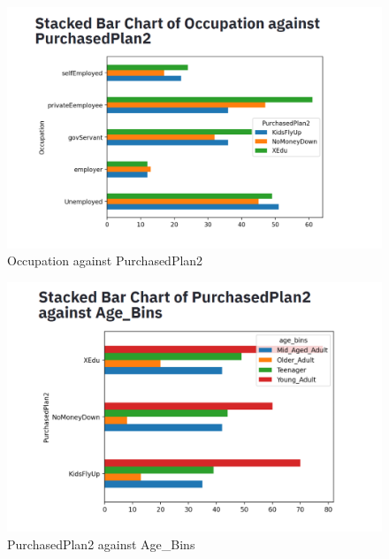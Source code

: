 \documentclass[11pt]{article}
\begin{document}
 \begin{figure}[H] 
     \centering
     \includegraphics[width=1.00\textwidth]{diagram3.png}
     \caption{Occupation against PurchasedPlan2}
     \label{fig:diagram3.png}
 \end{figure}
\vspace{0.3cm}

 \begin{figure}[H] 
     \centering
     \includegraphics[width=1.00\textwidth]{diagram4.png}
     \caption{PurchasedPlan2 against Age\_Bins}
     \label{fig:diagram4.png}
 \end{figure}
\vspace{0.3cm}
\end{document}
